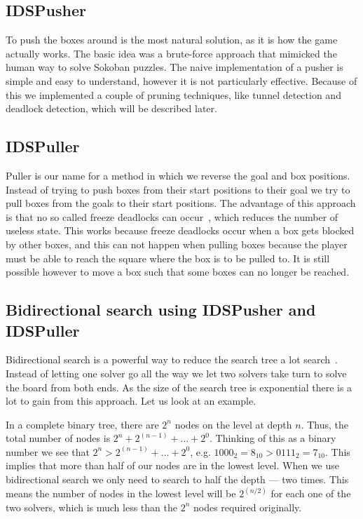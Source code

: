 \documentclass[a4paper,12pt]{article}
\renewcommand{\*}[0]{\cdot}
\begin{document}
\subsection{IDSPusher}

To push the boxes around is the most natural solution, as it is how the game
actually works. The basic idea was a brute-force approach that mimicked the
human way to solve Sokoban puzzles. The naive implementation of a pusher is
simple and easy to understand, however it is not particularly effective.
Because of this we implemented a couple of pruning techniques, like tunnel
detection and deadlock detection, which will be described later.

\subsection{IDSPuller}

Puller is our name for a method in which we reverse the goal and box positions.
Instead of trying to push boxes from their start positions to their goal we try
to pull boxes from the goals to their start positions. The advantage of this
approach is that no so called freeze deadlocks can occur~\cite{takes2007},
which reduces the number of useless state. This works because freeze deadlocks
occur when a box gets blocked by other boxes, and this can not happen when
pulling boxes because the player must be able to reach the square where the box
is to be pulled to. It is still possible however to move a box such that some
boxes can no longer be reached.


\subsection{Bidirectional search using IDSPusher and IDSPuller}

Bidirectional search is a powerful way to reduce the search tree a lot
search~\cite{russell2009}. Instead of letting one solver go all the way we let
two solvers take turn to solve the board from both ends. As the size of the
search tree is exponential there is a lot to gain from this approach. Let us
look at an example.

In a complete binary tree, there are $2^n$ nodes on the level at depth $n$.
Thus, the total number of nodes is $2^n + 2^{(n-1)} + \ldots + 2^0$. Thinking
of this as a binary number we see that $2^n > 2^{(n-1)} + \ldots + 2^0$, e.g.
$1000_2 = 8_{10} > 0111_2 = 7_{10}$. This implies that more than half of our
nodes are in the lowest level. When we use bidirectional search we only need to
search to half the depth --- two times. This means the number of nodes in the
lowest level will be $2^{(n/2)}$ for each one of the two solvers, which is much
less than the $2^n$ nodes required originally.
\end{document}
